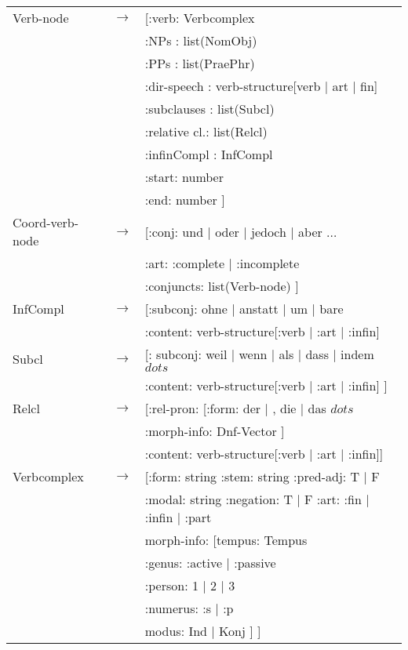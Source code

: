 \begin{tabular}{lll}

Verb-node & $\rightarrow$ & [:verb: Verbcomplex\\
                          && :NPs         : list(NomObj)\\
              && :PPs         : list(PraePhr) \\
              && :dir-speech  : verb-structure[verb $\mid$ art $\mid$ fin]\\
              && :subclauses  : list(Subcl)   \\
              && :relative cl.: list(Relcl)   \\
              && :infinCompl  : InfCompl\\
              && :start: number  \\
              && :end: number  ]\\                    

Coord-verb-node & $\rightarrow$ &  [:conj: und  $\mid$  oder  $\mid$ 
                                          jedoch  $\mid$  aber $\dots$ \\
                    && :art: :complete  $\mid$  :incomplete\\
                    && :conjuncts: list(Verb-node)  ]\\

InfCompl & $\rightarrow$ & [:subconj: ohne  $\mid$  anstatt  $\mid$  um
              $\mid$  bare\\ 
             && :content: verb-structure[:verb  $\mid$  :art  $\mid$  :infin]\\

Subcl & $\rightarrow$ &
         [: subconj: weil $\mid$ wenn $\mid$ als $\mid$ dass $\mid$ indem
         $dots$ \\ 
          && :content: verb-structure[:verb  $\mid$  :art  $\mid$  :infin]  ]\\

Relcl & $\rightarrow$ & [:rel-pron: [:form: der $\mid$ , die $\mid$  das
                     $dots$ \\  
                     && :morph-info: Dnf-Vector  ]\\
          && :content: verb-structure[:verb  $\mid$  :art  $\mid$  :infin]]\\

Verbcomplex & $\rightarrow$ & [:form: string    :stem: string
                :pred-adj: T $\mid$ F \\
                && :modal: string   :negation: T $\mid$ F   :art: :fin  $\mid$ 
                :infin  $\mid$  :part\\ 
                && morph-info: [tempus: Tempus\\
                             && :genus: :active  $\mid$  :passive\\
                             && :person: 1 $\mid$ 2 $\mid$ 3\\
                             && :numerus: :s $\mid$ :p\\
                && modus: Ind  $\mid$  Konj    ] ] \\


\end{tabular}
